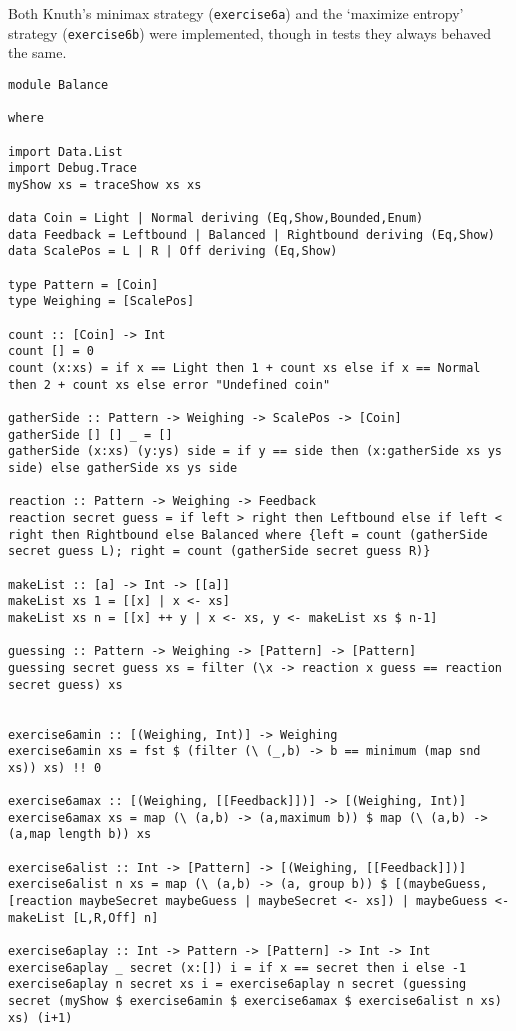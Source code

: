 \documentclass[a4paper,12pt]{amsart}
\begin{document}
Both Knuth's minimax strategy (\texttt{exercise6a}) and the `maximize entropy' strategy (\texttt{exercise6b}) were implemented, though in tests they always behaved the same.
\begin{verbatim}
module Balance

where 

import Data.List
import Debug.Trace
myShow xs = traceShow xs xs 

data Coin = Light | Normal deriving (Eq,Show,Bounded,Enum)
data Feedback = Leftbound | Balanced | Rightbound deriving (Eq,Show)
data ScalePos = L | R | Off deriving (Eq,Show)

type Pattern = [Coin]
type Weighing = [ScalePos]

count :: [Coin] -> Int
count [] = 0
count (x:xs) = if x == Light then 1 + count xs else if x == Normal then 2 + count xs else error "Undefined coin"

gatherSide :: Pattern -> Weighing -> ScalePos -> [Coin]
gatherSide [] [] _ = []
gatherSide (x:xs) (y:ys) side = if y == side then (x:gatherSide xs ys side) else gatherSide xs ys side

reaction :: Pattern -> Weighing -> Feedback
reaction secret guess = if left > right then Leftbound else if left < right then Rightbound else Balanced where {left = count (gatherSide secret guess L); right = count (gatherSide secret guess R)}

makeList :: [a] -> Int -> [[a]]
makeList xs 1 = [[x] | x <- xs]
makeList xs n = [[x] ++ y | x <- xs, y <- makeList xs $ n-1]

guessing :: Pattern -> Weighing -> [Pattern] -> [Pattern]
guessing secret guess xs = filter (\x -> reaction x guess == reaction secret guess) xs


exercise6amin :: [(Weighing, Int)] -> Weighing
exercise6amin xs = fst $ (filter (\ (_,b) -> b == minimum (map snd xs)) xs) !! 0

exercise6amax :: [(Weighing, [[Feedback]])] -> [(Weighing, Int)]
exercise6amax xs = map (\ (a,b) -> (a,maximum b)) $ map (\ (a,b) -> (a,map length b)) xs

exercise6alist :: Int -> [Pattern] -> [(Weighing, [[Feedback]])]
exercise6alist n xs = map (\ (a,b) -> (a, group b)) $ [(maybeGuess, [reaction maybeSecret maybeGuess | maybeSecret <- xs]) | maybeGuess <- makeList [L,R,Off] n]

exercise6aplay :: Int -> Pattern -> [Pattern] -> Int -> Int
exercise6aplay _ secret (x:[]) i = if x == secret then i else -1
exercise6aplay n secret xs i = exercise6aplay n secret (guessing secret (myShow $ exercise6amin $ exercise6amax $ exercise6alist n xs) xs) (i+1)


\end{verbatim}
\end{document}
